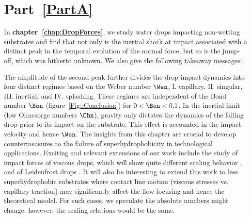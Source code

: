 \section*{Part~\ref{PartA}}

In \textbf{chapter~\ref{chap:DropForces}}, we study water drops impacting non-wetting substrates and find that not only is the inertial shock at impact associated with a distinct peak in the temporal evolution of the normal force, but so is the jump-off, which was hitherto unknown. We also give the following takeaway messages:\vspace{2mm}

\vspace{2mm}

The amplitude of the second peak further divides the drop impact dynamics into four distinct regimes based on the Weber number $\Wen$, I. capillary, II. singular, III. inertial, and IV. splashing. These regimes are independent of the Bond number $\Bon$ (figure~\ref{Fig::Conclusion}) for $0 < \Bon < 0.1$. In the inertial limit (low Ohnesorge numbers $\Ohn$), gravity only dictates the dynamics of the falling drop prior to its impact on the substrate. This effect is accounted in the impact velocity and hence $\Wen$. The insights from this chapter are crucial to develop countermeasures to the failure of superhydrophobicity in technological applications. Exciting and relevant extensions of our work include the study of impact forces of viscous drops, which will show quite different scaling behavior \cite{jha2020viscous}, and of Leidenfrost drops \cite{quere2013leidenfrost}. It will also be interesting to extend this work to less superhydrophobic substrates where contact line motion (viscous stresses vs. capillary traction) may significantly affect the flow focusing and hence the theoretical model. For such cases, we speculate the absolute numbers might change; however, the scaling relations would be the same.\\

